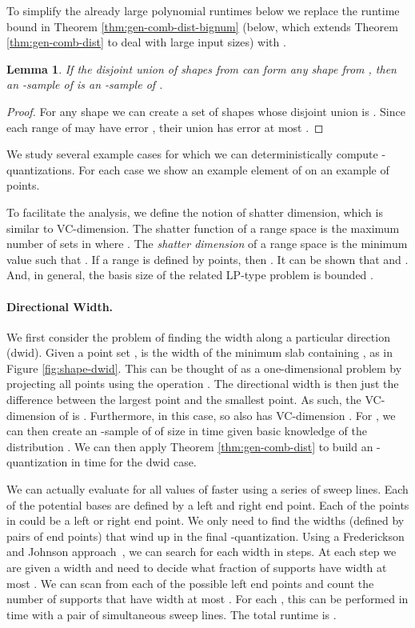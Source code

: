 \documentclass{journal}
\newcommand{\psets}{supports\xspace}
\newtheorem {lemma}[theorem]{Lemma}
\begin{document}
To simplify the already large polynomial runtimes below we replace the runtime bound in Theorem \ref{thm:gen-comb-dist-bignum} (below, which extends Theorem \ref{thm:gen-comb-dist} to deal with large input sizes) with .


\begin{lemma}
If the disjoint union of  shapes from  can form any shape from , then an -sample of  is an -sample of .
\end{lemma}
\begin{proof}
For any shape  we can create a set of  shapes  whose disjoint union is .  Since each range of  may have error , their union has error at most .
\end{proof}

We study several example cases for which we can deterministically compute -quantizations.  For each case we show an example element of  on an example of  points.

To facilitate the analysis, we define the notion of shatter dimension, which is similar to VC-dimension.  The shatter function  of a range space  is the maximum number of sets in  where .  The \emph{shatter dimension}  of a range space  is the minimum value such that .  If a range  is defined by  points, then .  It can be shown \cite{HP} that  and .
And, in general, the basis size of the related LP-type problem is bounded .





\paragraph{Directional Width.}
We first consider the problem of finding the width along a particular direction  (\textsf{dwid}).  Given a point set ,  is the width of the minimum slab containing , as in Figure \ref{fig:shape-dwid}.    This can be thought of as a one-dimensional problem by projecting all points  using the operation .  The directional width is then just the difference between the largest point and the smallest point.  As such, the VC-dimension of  is .  Furthermore,  in this case, so  also has VC-dimension .  For , we can then create an -sample  of  of size  in  time given basic knowledge of the distribution .
We can then apply Theorem \ref{thm:gen-comb-dist} to build an -quantization in time  for the \textsf{dwid} case.

We can actually evaluate  for all values of  faster using a series of sweep lines.  Each of the  potential bases are defined by a left and right end point.  Each of the  points in  could be a left or right end point.
We only need to find the  widths (defined by pairs of end points) that wind up in the final -quantization.
Using a Frederickson and Johnson approach~\cite{FJ84}, we can search for each width in  steps.  At each step we are given a width  and need to decide what fraction of \psets have width at most .  We can scan from each of the possible left end points and count the number of \psets that have width at most .  For each , this can be performed in  time with a pair of simultaneous sweep lines.
The total runtime is .
\end{document}
